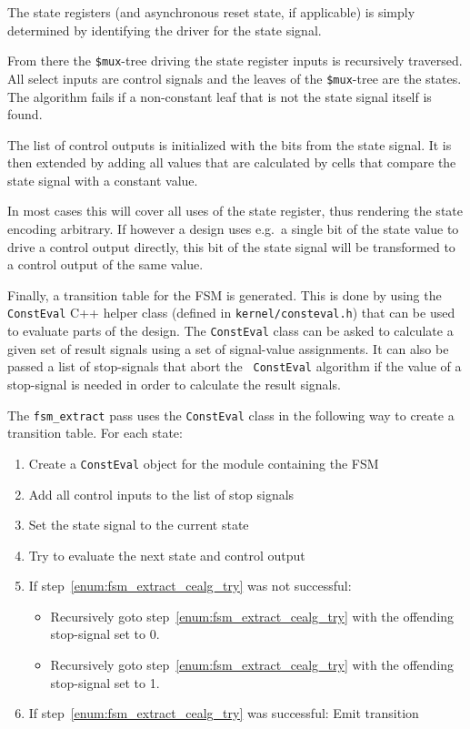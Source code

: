 The state registers (and asynchronous reset state, if applicable) is simply determined
by identifying the driver for the state signal.

From there the {\tt \$mux}-tree driving the state register inputs is
recursively traversed. All select inputs are control signals and the leaves of the
{\tt \$mux}-tree are the states. The algorithm fails if a non-constant leaf
that is not the state signal itself is found.

The list of control outputs is initialized with the bits from the state signal.
It is then extended by adding all values that are calculated by cells that
compare the state signal with a constant value.

In most cases this will cover all uses of the state register, thus rendering the
state encoding arbitrary. If however a design uses e.g.~a single bit of the state
value to drive a control output directly, this bit of the state signal will be
transformed to a control output of the same value.

Finally, a transition table for the FSM is generated. This is done by using the
{\tt ConstEval} C++ helper class (defined in {\tt kernel/consteval.h}) that can
be used to evaluate parts of the design. The {\tt ConstEval} class can be asked
to calculate a given set of result signals using a set of signal-value
assignments. It can also be passed a list of stop-signals that abort the {\tt
ConstEval} algorithm if the value of a stop-signal is needed in order to
calculate the result signals.

The {\tt fsm\_extract} pass uses the {\tt ConstEval} class in the following way
to create a transition table. For each state:

\begin{enumerate}
\item Create a {\tt ConstEval} object for the module containing the FSM
\item Add all control inputs to the list of stop signals
\item Set the state signal to the current state
\item Try to evaluate the next state and control output \label{enum:fsm_extract_cealg_try}
\item If step~\ref{enum:fsm_extract_cealg_try} was not successful:
\begin{itemize}
\item Recursively goto step~\ref{enum:fsm_extract_cealg_try} with the offending stop-signal set to 0.
\item Recursively goto step~\ref{enum:fsm_extract_cealg_try} with the offending stop-signal set to 1.
\end{itemize}
\item If step~\ref{enum:fsm_extract_cealg_try} was successful: Emit transition
\end{enumerate}

